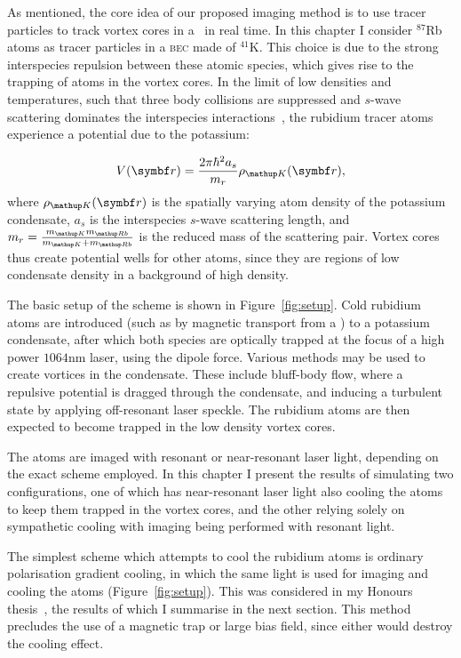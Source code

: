 As mentioned, the core idea of our proposed imaging method is to use tracer particles to track vortex cores in a \bec\ in real time. In this chapter I consider $^{87}$Rb atoms as tracer particles in a \textsc{bec} made of $^{41}$K. This choice is due to the strong interspecies repulsion between these atomic species, which gives rise to the trapping of atoms in the vortex cores. In the limit of low densities and temperatures, such that three body collisions are suppressed and $s$-wave scattering dominates the interspecies interactions~\cite[p 120]{leggett_quantum_2006}, the rubidium tracer atoms experience a potential due to the potassium:

\begin{equation}
V(\vec{r}) = \frac{2\pi\hbar^2 a_s}{m_r}\rho_\up{K}(\vec{r}),
\end{equation}
where $\rho_\up{K}(\vec{r})$ is the spatially varying atom density of the potassium condensate, $a_s$ is the interspecies $s$-wave scattering length, and
$m_r = \frac{m_\up{K}m_\up{Rb}}{m_\up{K} + m_\up{Rb}}$ is the reduced mass of the scattering pair. Vortex cores thus create potential wells for other atoms, since they are regions of low condensate density in a background of high density.

The basic setup of the scheme is shown in Figure~\ref{fig:setup}. Cold rubidium atoms are introduced (such as by magnetic transport from a \mot) to a potassium condensate, after which both species are optically trapped at the focus of a high power $1064$nm laser, using the dipole force. Various methods may be used to create vortices in the condensate. These include bluff-body flow, where a repulsive potential is dragged through the condensate, and inducing a turbulent state by applying off-resonant laser speckle. The rubidium atoms are then expected to become trapped in the low density vortex cores.

The atoms are imaged with resonant or near-resonant laser light, depending on the exact scheme employed. In this chapter I present the results of simulating two configurations, one of which has near-resonant laser light also cooling the atoms to keep them trapped in the vortex cores, and the other relying solely on sympathetic cooling with imaging being performed with resonant light.

The simplest scheme which attempts to cool the rubidium atoms is ordinary polarisation gradient cooling, in which the same light is used for imaging and cooling the atoms (Figure~\ref{fig:setup}). This was considered in my Honours thesis~\cite{billington_particle_2010}, the results of which I summarise in the next section. This method precludes the use of a magnetic trap or large bias field, since either would destroy the cooling effect.

